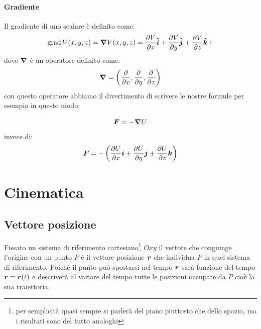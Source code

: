 \subsubsection{Gradiente}
\label{gradiente}
Il gradiente di uno scalare è definito come:
\begin{equation*}
\operatorname{grad} V(x,y,z)=\boldsymbol{\nabla} V(x,y,z)=\frac{\partial V}{\partial x}\boldsymbol{\hat {i}} + \frac{\partial V}{\partial y}\boldsymbol{\hat {j}} +\frac{\partial V}{\partial z}\boldsymbol{\hat {k}} +
\end{equation*}
dove $\boldsymbol{\nabla}$ è un operatore definito come:
\begin{equation*}
\boldsymbol{\nabla}=\left(\frac{\partial}{\partial x},\frac{\partial}{\partial y},\frac{\partial }{\partial z}\right)
\end{equation*}
con questo operatore abbiamo il divertimento di scrivere le nostre formule per esempio in questo modo:

\begin{equation*}
\boldsymbol{F}=-\boldsymbol{\nabla} U
\end{equation*}
invece di:
\begin{equation*}
\boldsymbol{F}=-\left(\frac{\partial U}{\partial
x}\boldsymbol{i}+\frac{\partial U}{\partial y}\boldsymbol{j}+\frac{\partial
U}{\partial z}\boldsymbol{k}\right)
\end{equation*}

\chapter{Cinematica}
\section{Vettore posizione}
Fissato un sistema di riferimento cartesiano\footnote{per semplicità quasi sempre si parlerà del piano piuttosto che dello spazio, ma i risultati sono del tutto analoghi} $Oxy$ il vettore che congiunge l'origine con un punto $P$ è il vettore posizione $\boldsymbol{r}$ che individua $P$ in quel sistema di riferimento. Poiché il punto può spostarsi nel tempo $\boldsymbol{r}$ sarà funzione del tempo $\boldsymbol{r}=\boldsymbol{r}(t)$ e descriverà al variare del tempo tutte le posizioni occupate da $P$ cioè la sua traiettoria.

